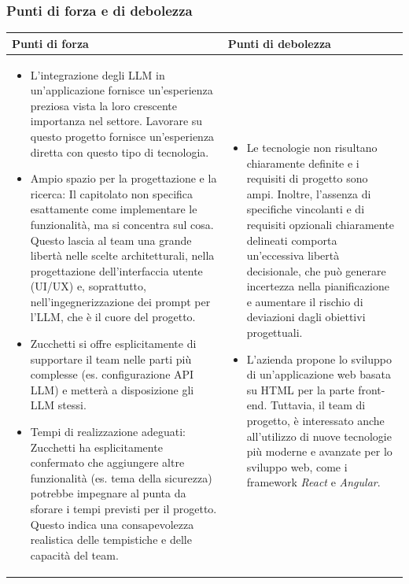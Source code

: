 \documentclass[a4paper,11pt]{article}
\begin{document}
\subsubsection{Punti di forza e di debolezza}
{\footnotesize
\begin{tabularx}{\textwidth}{|X|X|}
\hline
\rowcolor{lightgray!40} %
\textbf{Punti di forza} & \textbf{Punti di debolezza} \\
\hline
\begin{itemize}
\item  L'integrazione degli LLM in un'applicazione fornisce un'esperienza preziosa vista la loro crescente importanza nel settore. Lavorare su questo progetto fornisce un'esperienza diretta con questo tipo di tecnologia.
\item  Ampio spazio per la progettazione e la ricerca: Il capitolato non specifica esattamente come implementare le funzionalità, ma si concentra sul cosa. Questo lascia al team una grande libertà nelle scelte architetturali, nella progettazione dell'interfaccia utente (UI/UX) e, soprattutto, nell'ingegnerizzazione dei prompt per l'LLM, che è il cuore del progetto.
\item Zucchetti si offre esplicitamente di supportare il team nelle parti più complesse (es. configurazione API LLM) e metterà a disposizione gli LLM stessi. 
\item Tempi di realizzazione adeguati: Zucchetti ha esplicitamente confermato che aggiungere altre funzionalità (es. tema della sicurezza) potrebbe impegnare al punta da sforare i tempi previsti per il progetto. Questo indica una consapevolezza realistica delle tempistiche e delle capacità del team.
\end{itemize}
 & \begin{itemize}
\item Le tecnologie non risultano chiaramente definite e i requisiti di progetto sono ampi. Inoltre, l’assenza di specifiche vincolanti e di requisiti opzionali chiaramente delineati comporta un’eccessiva libertà decisionale, che può generare incertezza nella pianificazione e aumentare il rischio di deviazioni dagli obiettivi progettuali.
\item  L’azienda propone lo sviluppo di un’applicazione web basata su HTML per la parte front-end. Tuttavia, il team di progetto, è interessato anche all'utilizzo di nuove tecnologie più moderne e avanzate per lo sviluppo web, come i framework \textit{React} e \textit{Angular}. 
\end{itemize} \\
\hline
\end{tabularx}
}
\end{document}
